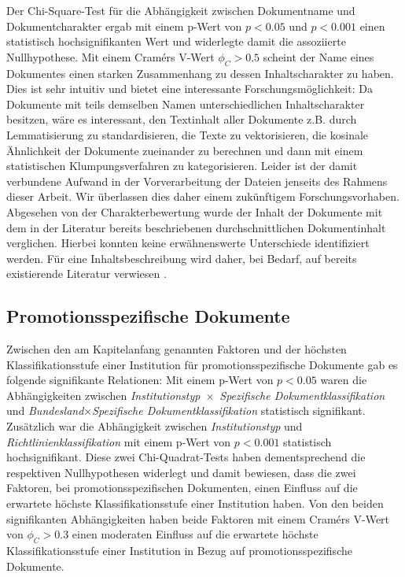 Der Chi-Square-Test für die Abhängigkeit zwischen Dokumentname und Dokumentcharakter ergab mit einem p-Wert von $p<\num{0.05}$ und $p<\num{0.001}$ einen statistisch hochsignifikanten Wert und widerlegte damit die assoziierte Nullhypothese.
Mit einem Cramérs V-Wert $\phi_C>\num{0,5}$ scheint der Name eines Dokumentes einen starken Zusammenhang zu dessen Inhaltscharakter zu haben.
Dies ist sehr intuitiv und bietet eine interessante Forschungsmöglichkeit:
Da Dokumente mit teils demselben Namen unterschiedlichen Inhaltscharakter besitzen, wäre es interessant, den Textinhalt aller Dokumente z.B. durch Lemmatisierung zu standardisieren, die Texte zu vektorisieren, die kosinale Ähnlichkeit der Dokumente zueinander zu berechnen und dann mit einem statistischen Klumpungsverfahren zu kategorisieren.
Leider ist der damit verbundene Aufwand in der Vorverarbeitung der Dateien jenseits des Rahmens dieser Arbeit.
Wir überlassen dies daher einem zukünftigem Forschungsvorhaben.
Abgesehen von der Charakterbewertung wurde der Inhalt der Dokumente mit dem in der Literatur bereits beschriebenen durchschnittlichen Dokumentinhalt verglichen.
Hierbei konnten keine erwähnenswerte Unterschiede identifiziert werden.
Für eine Inhaltsbeschreibung wird daher, bei Bedarf, auf bereits existierende Literatur verwiesen \autocite{Hiemenz2018-fdm-title,Hiemenz2018-fdm-report}.

\subsection{Promotionsspezifische Dokumente}\label{sec:policy-discussion-specific}
Zwischen den am Kapitelanfang genannten Faktoren und der höchsten Klassifikationsstufe einer Institution für promotionsspezifische Dokumente gab es folgende signifikante Relationen:
Mit einem p-Wert von $p<\num{0,05}$ waren die Abhängigkeiten zwischen \textit{Institutionstyp}~$\times$~\textit{Spezifische Dokumentklassifikation} und \textit{Bundesland}$\times$\textit{Spezifische Dokumentklassifikation} statistisch signifikant.
Zusätzlich war die Abhängigkeit zwischen \textit{Institutionstyp} und \textit{Richtlinienklassifikation} mit einem p-Wert von $p<\num{0,001}$ statistisch hochsignifikant.
Diese zwei Chi-Quadrat-Tests haben dementsprechend die respektiven Nullhypothesen widerlegt und damit bewiesen, dass die zwei Faktoren, bei promotionsspezifischen Dokumenten, einen Einfluss auf die erwartete höchste Klassifikationsstufe einer Institution haben.
Von den beiden signifikanten Abhängigkeiten haben beide Faktoren mit einem Cramérs V-Wert von $\phi_C>\num{0.3}$ einen moderaten Einfluss auf die erwartete höchste Klassifikationsstufe einer Institution in Bezug auf promotionsspezifische Dokumente.

